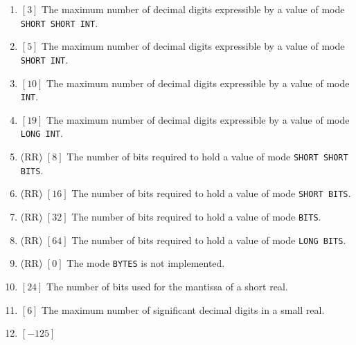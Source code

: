 \begin{enumerate}
\item {} $[3]$
\newline
The maximum number of decimal digits expressible by a value of mode
\verb|SHORT SHORT INT|.
\item {} $[5]$ \newline
The maximum number of decimal digits expressible by a value of mode
\verb|SHORT INT|.

\item {} $[10]$
\newline
The maximum number of decimal digits expressible by a value of mode
\verb|INT|.
\item {} $[19]$ \newline
The maximum number of decimal digits expressible by a value of mode
\verb|LONG INT|.
\item {}
(RR) $[8]$ \newline
The number of bits required to hold a value of mode
\verb|SHORT SHORT BITS|.
\item {} (RR) $[16]$ \newline
The number of bits required to hold a value of mode \verb|SHORT BITS|.
\item {} (RR) $[32]$ \newline
The number of bits required to hold a value of mode \verb|BITS|.
\item {} (RR) $[64]$ \newline
The number of bits required to hold a value of mode \verb|LONG BITS|.
\item {}
(RR) $[0]$ \newline
The mode \verb|BYTES| is not implemented.
\item {} $[24]$
\newline
The number of bits used for the mantissa of a short real.
\item {} $[6]$ \newline
The maximum number of significant decimal digits in a small real.
\item {} $[-125]$ \newline

\end{enumerate}
